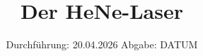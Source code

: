 

\subject{V61}
\title{Der HeNe-Laser}
\date{%
  Durchführung: 20.04.2026
  \hspace{3em}
  Abgabe: DATUM
}




\maketitle
\thispagestyle{empty}
\tableofcontents
\newpage








\printbibliography{}



